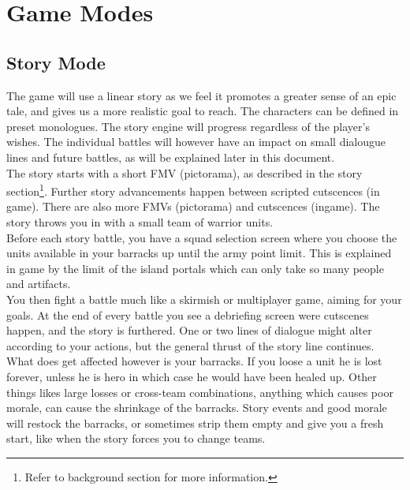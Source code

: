 \documentclass[a4paper]{article}
\begin{document}
\newpage \section{Game Modes}

\subsection{Story Mode}

The game will use a linear story as we feel it promotes a greater sense of an epic tale, and gives us a more realistic goal to reach. The characters can be defined in preset monologues. The story engine will progress regardless of the player's wishes. The individual battles will however have an impact on small dialougue lines and future battles, as will be explained later in this document.\\

The story starts with a short FMV (pictorama), as described in the story section\footnote {Refer to background section for more information.}. Further story advancements happen between scripted cutscences (in game). There are also more FMVs (pictorama) and cutscences (ingame). The story throws you in with a small team of warrior units.\\

Before each story battle, you have a squad selection screen where you choose the units available in your barracks up until the army point limit. This is explained in game by the limit of the island portals which can only take so many people and artifacts.\\

You then fight a battle much like a skirmish or multiplayer game, aiming for your goals. At the end of every battle you see a debriefing screen were cutscenes happen, and the story is furthered. One or two lines of dialogue might alter according to your actions, but the general thrust of the story line continues.\\

What does get affected however is your barracks. If you loose a unit he is lost forever, unless he is hero in which case he would have been healed up. Other things likes large losses or cross-team combinations, anything which causes poor morale, can cause the shrinkage of the barracks. Story events and good morale will restock the barracks, or sometimes strip them empty and give you a fresh start, like when the story forces you to change teams.\\
\end{document}
